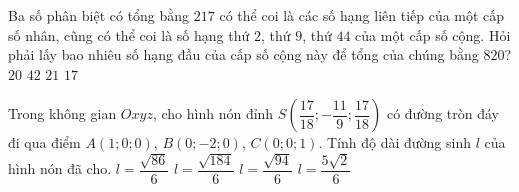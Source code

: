 \begin{ex}%
	Ba số phân biệt có tổng bằng $217$ có thể coi là các số hạng liên tiếp của một cấp số nhân, cũng có thể coi là số hạng thứ $2$, thứ $9$, thứ $44$ của một cấp số cộng. Hỏi phải lấy bao nhiêu số hạng đầu của cấp số cộng này để tổng của chúng bằng $820$?
	\choice
	{\True $20$}
	{$42$}
	{$21$}
	{$17$}
\end{ex}

\begin{ex}%
Trong không gian $Oxyz$, cho hình nón đỉnh $S\left(\dfrac{17}{18};-\dfrac{11}{9};\dfrac{17}{18}\right)$ có đường tròn đáy đi qua điểm $A(1;0;0)$, $B(0;-2;0)$, $C(0;0;1)$. Tính độ dài đường sinh $l$ của hình nón đã cho.
	\choice
	{\True $l=\dfrac{\sqrt{86}}{6}$}
	{$l=\dfrac{\sqrt{184}}{6}$}
	{$l=\dfrac{\sqrt{94}}{6}$}
	{$l=\dfrac{5\sqrt{2}}{6}$}
	\end{ex}
	
